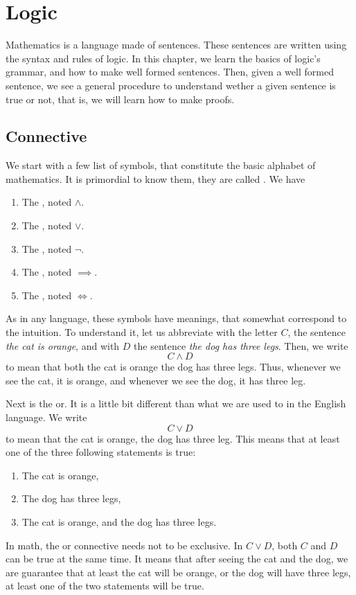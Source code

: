 \section{Logic}

Mathematics is a language made of sentences. These sentences are written using the syntax and rules of logic. In this chapter, we learn the basics of logic's grammar, and how to make well formed sentences. Then, given a well formed sentence, we see a general procedure to understand wether a given sentence is true or not, that is, we will learn how to make proofs. 

\subsection{Connective}

We start with a few list of symbols, that constitute the basic alphabet of mathematics. It is primordial to know them, they are called . We have

\begin{enumerate}
    \item The , noted \( \land \). 
    \item The , noted \( \lor \). 
    \item The , noted \( \neg \). 
    \item The , noted \( \implies \). 
    \item The , noted \( \iff \). 
\end{enumerate}

As in any language, these symbols have meanings, that somewhat correspond to the intuition. To understand it, let us abbreviate with the letter \( C \), the sentence \textit{the cat is orange}, and with \( D \) the sentence \textit{the dog has three legs}. Then, we write
\begin{equation*}
    C \land D
\end{equation*}
to mean that both the cat is orange  the dog has three legs. Thus, whenever we see the cat, it is orange, and whenever we see the dog, it has three leg. 

Next is the or. It is a little bit different than what we are used to in the English language. We write
\begin{equation*}
    C \lor D
\end{equation*}
to mean that the cat is orange,  the dog has three leg. This means that at least one of the three following statements is true:
\begin{enumerate}
    \item The cat is orange,
    \item The dog has three legs,
    \item The cat is orange, and the dog has three legs.
\end{enumerate}
In math, the or connective needs not to be exclusive. In \( C \lor D \), both \( C \) and \( D \) can be true at the same time. It means that after seeing the cat and the dog, we are guarantee that at least the cat will be orange, or the dog will have three legs, at least one of the two statements will be true. 

